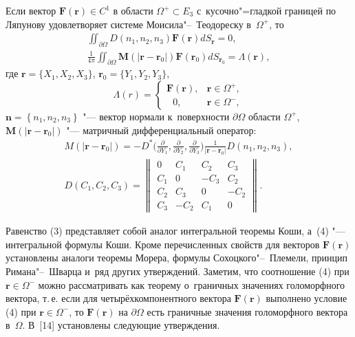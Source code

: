 \begin{theorem} 
Если вектор $\boldsymbol{F}(\boldsymbol{r})\in C^{1}$ в области  $\Omega^{+}\subset E_{3}$ с~кусочно"=гладкой границей по Ляпунову удовлетворяет системе Моисила"--~Теодореску в~$\Omega^{+}$, то
\begin{gather}
\iint _{\partial\Omega} D(n_{1}, n_{2}, n_{3})\boldsymbol{F}(\boldsymbol{r})dS_{\boldsymbol r}=0, \\
\frac{1}{4\pi}\iint_{\partial\Omega}\boldsymbol M(|\boldsymbol r-\boldsymbol r_{0}|) 
\boldsymbol{F}(\boldsymbol{r}_{0})dS_{\boldsymbol r_0}=\Lambda (\boldsymbol r),
\end{gather}
где $\boldsymbol{r}=\{X_{1}, X_{2}, X_{3}\}$, $\boldsymbol{r}_{0}=\{Y_{1}, Y_{2}, Y_{3}\}$,
$$
\Lambda(r)= \begin{cases}
\boldsymbol F (\boldsymbol r ), & \boldsymbol r \in \Omega^{+},\\
~~~0, & \boldsymbol r \in \Omega^{-},
\end{cases}
$$
 $\boldsymbol{n}=\left\{n_{1}, n_{2}, n_{3} \right\}$ "--- вектор нормали к~поверхности $\partial\Omega $ области $\Omega^{+}$,  \\
 $\boldsymbol M(|\boldsymbol{r}- \boldsymbol{r}_{0}|)$ "--- матричный дифференциальный оператор:
\begin{gather*}
M(|\boldsymbol{r}- \boldsymbol{r}_{0}|)=-D^{*}\Bigg(\frac{\partial}{\partial Y_{1}},
\frac{\partial}{\partial Y_{2}}, \frac{\partial}{\partial Y_{3}}\Bigg)
\frac{1}{|\boldsymbol{r}-\boldsymbol{r}_{0}|}D(n_{1}, n_{2}, n_{3}),
\\
D(C_{1}, C_{2}, C_{3})=\left\|\begin{array}{lccr}0 & C_{1} & C_{2} & C_{3}\\
C_{1} & 0 & -C_{3} & C_{2} \\ C_{2} & C_{3} & 0 & -C_{2} \\
C_{3} & -C_{2} & C_{1} & 0 \end{array} \right\|.
\end{gather*}

\end{theorem}

Равенство (3) представляет собой аналог интегральной теоремы Коши, а~(4) "---  интегральной формулы Коши. 
Кроме перечисленных свойств для векторов $\boldsymbol{F}(\boldsymbol{r})$ установлены аналоги теоремы Морера, 
формулы Сохоцкого"--~Племели, принцип Римана"--~Шварца и~ряд других утверждений. 
Заметим, что соотношение (4) при $\boldsymbol r \in \Omega^{-}$ можно рассматривать как теорему о~граничных значениях голоморфного вектора, т.\,е. если для четырёхкомпонентного вектора
$\boldsymbol{F}(\boldsymbol{r})$ выполнено условие (4) при $\boldsymbol r \in \Omega^{-}$, то $\boldsymbol{F}(\boldsymbol{r})$ на $\partial\Omega $ есть граничные значения голоморфного вектора в~$\Omega$.
В~[14] установлены следующие утверждения.


